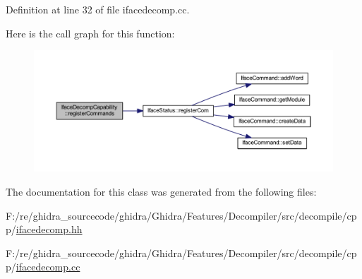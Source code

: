 Definition at line 32 of file ifacedecomp.\+cc.

Here is the call graph for this function\+:
\nopagebreak
\begin{figure}[H]
\begin{center}
\leavevmode
\includegraphics[width=350pt]{class_iface_decomp_capability_a9812c0648c6f50b11fccf2d262059f40_cgraph}
\end{center}
\end{figure}


The documentation for this class was generated from the following files\+:\begin{DoxyCompactItemize}
\item 
F\+:/re/ghidra\+\_\+sourcecode/ghidra/\+Ghidra/\+Features/\+Decompiler/src/decompile/cpp/\mbox{\hyperlink{ifacedecomp_8hh}{ifacedecomp.\+hh}}\item 
F\+:/re/ghidra\+\_\+sourcecode/ghidra/\+Ghidra/\+Features/\+Decompiler/src/decompile/cpp/\mbox{\hyperlink{ifacedecomp_8cc}{ifacedecomp.\+cc}}\end{DoxyCompactItemize}
